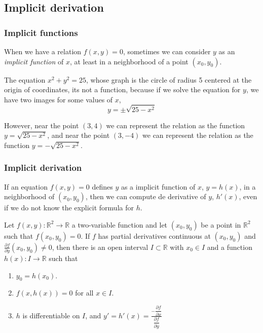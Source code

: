 \subsection{Implicit derivation}
\begin{frame}
\frametitle{Implicit functions}
When we have a relation $f(x,y)=0$, sometimes we can consider $y$ as an \emph{implicit function} of $x$, at least in a neighborhood of a point $(x_0,y_0)$.

The equation $x^2+y^2=25$, whose graph is the circle of radius 5 centered at the origin of coordinates, its not a function, because if we solve the equation for $y$, we have two images for some values of $x$,
\[
y=\pm \sqrt{25-x^2}
\]

However, near the point $(3,4)$ we can represent the relation as the function $y=\sqrt{25-x^2}$, and near the point $(3,-4)$ we can represent the relation as the function $y=-\sqrt{25-x^2}$.
\end{frame}


\begin{frame}
\frametitle{Implicit derivation}
If an equation $f(x,y)=0$ defines $y$ as a implicit function of $x$, $y=h(x)$, in a neighborhood of $(x_0,y_0)$, then
we can compute de derivative of $y$, $h'(x)$, even if we do not know the explicit formula for $h$.

\begin{theorem}
Let $f(x,y):\mathbb{R}^2\longrightarrow \mathbb{R}$ a two-variable function and let $(x_0,y_0)$ be a point in $\mathbb{R}^2$ such that $f(x_0,y_0)=0$.
If $f$ has partial derivatives continuous at $(x_0,y_0)$ and $\frac{\partial f}{\partial y}(x_0,y_0)\neq 0$, then there is an open interval $I\subset \mathbb{R}$ with $x_0\in I$ and a function $h(x): I\longrightarrow \mathbb{R}$ such that
\begin{enumerate}
\item $y_0=h(x_0)$.
\item $f(x,h(x))=0$ for all $x\in I$.
\item $h$ is differentiable on $I$, and $y'=h'(x)=\frac{-\dfrac{\partial f}{\partial x}}{\dfrac{\partial f}{\partial y}}$
\end{enumerate}
\end{theorem}
\end{frame}


